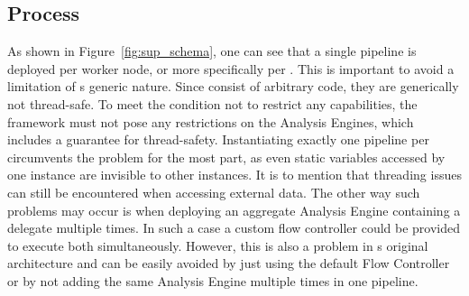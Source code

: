 \subsection{Process}
As shown in Figure~\ref{fig:sup_schema}, one can see that a single pipeline is deployed per worker node, or more specifically per \jvm{}. This is important to avoid a limitation of \uima{}s generic nature. Since \anens{} consist of arbitrary code, they are generically not thread-safe. To meet the condition not to restrict any \uima{} capabilities, the framework must not pose any restrictions on the Analysis Engines, which includes a guarantee for thread-safety. Instantiating exactly one pipeline per \jvm{} circumvents the problem for the most part, as even static variables accessed by one instance are invisible to other instances. It is to mention that threading issues can still be encountered when accessing external data. The other way such problems may occur is when deploying an aggregate Analysis Engine containing a delegate \anen{} multiple times. In such a case a custom flow controller could be provided to execute both \anens{} simultaneously. However, this is also a problem in \uima{}s original architecture and can be easily avoided by just using the default Flow Controller or by not adding the same Analysis Engine multiple times in one pipeline.

